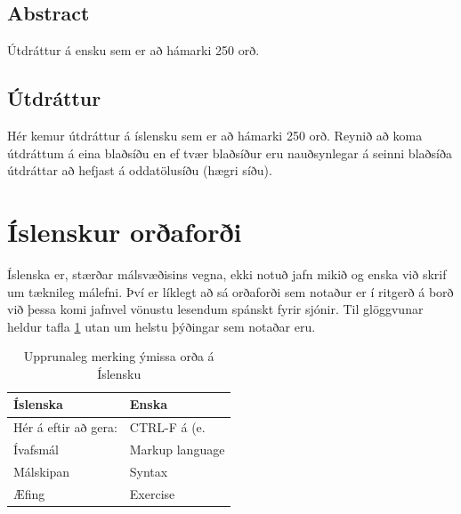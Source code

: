 \documentclass[a4paper,12pt,twoside,BCOR=10mm]{scrbook}
\begin{document}
\setcounter{page}{5}
\section*{\huge Abstract}
Útdráttur á ensku sem er að hámarki 250 orð.
\vfill \vspace*{1cm}
\section*{\huge Útdráttur}
Hér kemur útdráttur á íslensku sem er að hámarki 250 orð. Reynið að koma útdráttum á eina blaðsíðu en ef tvær blaðsíður eru nauðsynlegar á seinni blaðsíða útdráttar að hefjast á oddatölusíðu (hægri síðu).
\vfill
\newpage

\tableofcontents
\listoffigures
\listoftables
\listoflistings

\chapter*{Íslenskur orðaforði}

Íslenska er, stærðar málsvæðisins vegna, ekki notuð jafn mikið og enska við skrif um tæknileg málefni. 
Því er líklegt að sá orðaforði sem notaður er í ritgerð á borð við þessa komi jafnvel vönustu lesendum spánskt fyrir sjónir. 
Til glöggvunar heldur tafla \ref{tab:translations} utan um helstu þýðingar sem notaðar eru.

\begin{table}
\caption{Upprunaleg merking ýmissa orða á Íslensku}
\label{tab:translations}
\begin{center}
\begin{tabular}{ll}
\toprule
Íslenska&Enska\\
\midrule
Hér á eftir að gera: &CTRL-F á (e. \\
Ívafsmál & Markup language\\
Málskipan & Syntax\\
Æfing & Exercise\\
\bottomrule
\end{tabular}
\end{center}
\end{table}


% 
% 
\end{document}
